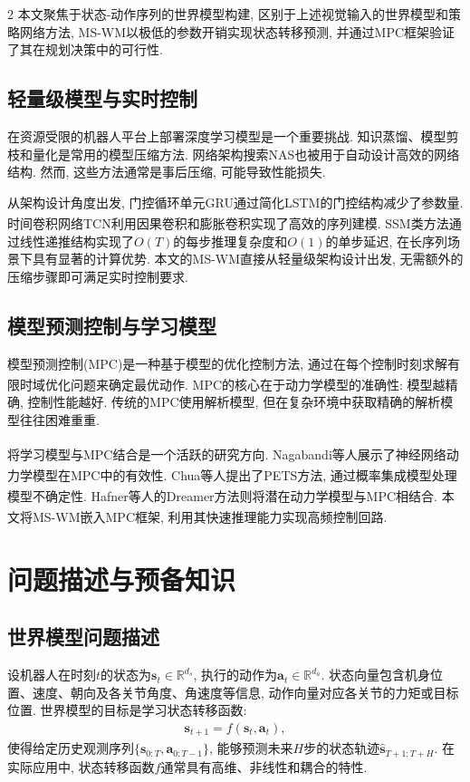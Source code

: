 \begin{multicols}{2}
本文聚焦于状态-动作序列的世界模型构建, 区别于上述视觉输入的世界模型和策略网络方法,
MS-WM以极低的参数开销实现状态转移预测, 并通过MPC框架验证了其在规划决策中的可行性.

\subsection{轻量级模型与实时控制}

在资源受限的机器人平台上部署深度学习模型是一个重要挑战.
知识蒸馏、模型剪枝和量化是常用的模型压缩方法.
网络架构搜索NAS也被用于自动设计高效的网络结构.
然而, 这些方法通常是事后压缩, 可能导致性能损失.

从架构设计角度出发, 门控循环单元GRU通过简化LSTM的门控结构减少了参数量.
时间卷积网络TCN利用因果卷积和膨胀卷积实现了高效的序列建模.
SSM类方法\textsuperscript{\cite{6,8}}通过线性递推结构实现了$O(T)$的每步推理复杂度和$O(1)$的单步延迟,
在长序列场景下具有显著的计算优势.
本文的MS-WM直接从轻量级架构设计出发, 无需额外的压缩步骤即可满足实时控制要求.

\subsection{模型预测控制与学习模型}

模型预测控制(MPC)是一种基于模型的优化控制方法,
通过在每个控制时刻求解有限时域优化问题来确定最优动作\textsuperscript{\cite{12}}.
MPC的核心在于动力学模型的准确性: 模型越精确, 控制性能越好.
传统的MPC使用解析模型, 但在复杂环境中获取精确的解析模型往往困难重重.

将学习模型与MPC结合是一个活跃的研究方向.
Nagabandi等人\textsuperscript{\cite{12}}展示了神经网络动力学模型在MPC中的有效性.
Chua等人\textsuperscript{\cite{24}}提出了PETS方法, 通过概率集成模型处理模型不确定性.
Hafner等人\textsuperscript{\cite{10}}的Dreamer方法则将潜在动力学模型与MPC相结合.
本文将MS-WM嵌入MPC框架, 利用其快速推理能力实现高频控制回路\textsuperscript{\cite{25}}.

\section{问题描述与预备知识}

\subsection{世界模型问题描述}

设机器人在时刻$t$的状态为${\bm s}_t \in \mathbb{R}^{d_s}$, 执行的动作为${\bm a}_t \in \mathbb{R}^{d_a}$.
状态向量包含机身位置、速度、朝向及各关节角度、角速度等信息, 动作向量对应各关节的力矩或目标位置.
世界模型的目标是学习状态转移函数:
\begin{eqnarray}
{\bm s}_{t+1} = f({\bm s}_t, {\bm a}_t),
\end{eqnarray}
使得给定历史观测序列$\{{\bm s}_{0:T}, {\bm a}_{0:T-1}\}$,
能够预测未来$H$步的状态轨迹$\hat{{\bm s}}_{T+1:T+H}$.
在实际应用中, 状态转移函数$f$通常具有高维、非线性和耦合的特性.


\end{multicols}
